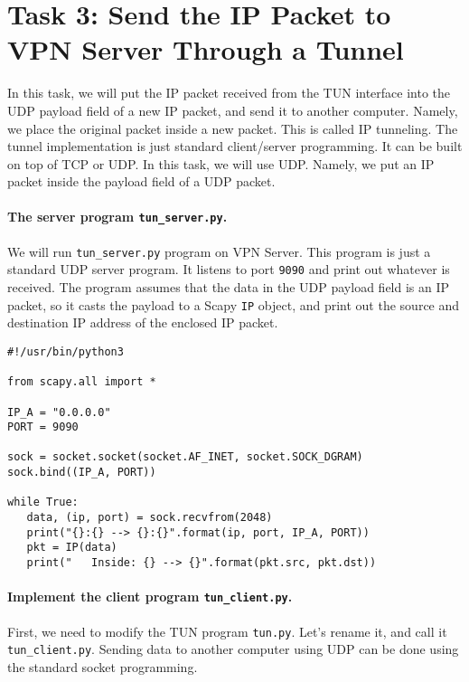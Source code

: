 \section{Task 3: Send the IP Packet to VPN Server Through a Tunnel} 


In this task, we will put the IP packet received from the TUN interface
into the UDP payload field of a new IP packet, and send it to another computer. 
Namely, we place the original packet inside a new packet. This is called IP tunneling. 
The tunnel implementation is just standard client/server programming.
It can be built on top of TCP or UDP. In this task, we will use UDP.
Namely, we put an IP packet inside the payload field of a UDP packet. 


\paragraph{The server program \texttt{tun\_server.py}.}
We will run \texttt{tun\_server.py} program on VPN Server.
This program is just a standard UDP server program. It 
listens to port \texttt{9090} and print out whatever is 
received.  The program assumes that the data in the UDP payload 
field is an IP packet, so it 
casts the payload to a Scapy \texttt{IP} object, and print out 
the source and destination IP address of the enclosed IP packet. 


\begin{lstlisting}[caption={\texttt{tun\_server.py}}, label=vpn:list:tun_server]
#!/usr/bin/python3

from scapy.all import *

IP_A = "0.0.0.0"
PORT = 9090

sock = socket.socket(socket.AF_INET, socket.SOCK_DGRAM)
sock.bind((IP_A, PORT))

while True:
   data, (ip, port) = sock.recvfrom(2048)
   print("{}:{} --> {}:{}".format(ip, port, IP_A, PORT))
   pkt = IP(data)
   print("   Inside: {} --> {}".format(pkt.src, pkt.dst))
\end{lstlisting}



\paragraph{Implement the client program \texttt{tun\_client.py}.}
First, we need to modify the TUN program \texttt{tun.py}. Let's rename it, and call it 
\texttt{tun\_client.py}.  Sending data to another computer using UDP
can be done using the standard socket programming. 

